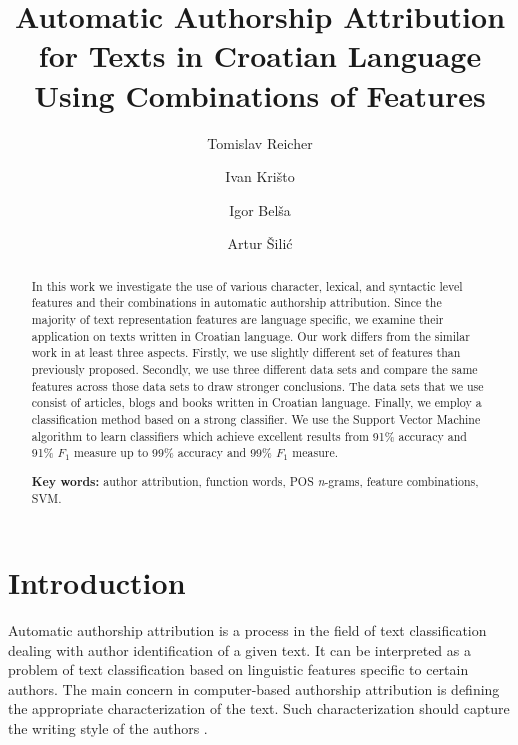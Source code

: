 \documentclass{llncs}
\begin{document}
\title{Automatic Authorship Attribution\\ for Texts in Croatian Language\\ Using
Combinations of Features}
\author{Tomislav Reicher \and Ivan Krišto \and Igor Belša \and Artur Šilić}

\maketitle

\begin{abstract}
In this work we investigate the use of various character, lexical, and syntactic
level features and their combinations in automatic authorship attribution. Since
the majority of text representation features are language specific, we examine
their application on texts written in Croatian language. Our work differs from
the similar work in at least three aspects. Firstly, we use slightly different
set of features than previously proposed. Secondly, we use three different
data sets and compare the same features across those data sets to draw stronger
conclusions. The data sets that we use consist of articles, blogs and books
written in Croatian language. Finally, we employ a classification method based on
a strong classifier. We use the Support Vector Machine algorithm to learn classifiers
which achieve excellent results from 91\% accuracy and 91\% $F_1$ measure up to
99\% accuracy and 99\% $F_1$ measure.

\vspace{10pt}
\textbf{Key words:} author attribution, function words, POS \emph{n}-grams,
feature combinations, SVM.
\end{abstract}


\section{Introduction}
Automatic authorship attribution is a process in the field of text classification
dealing with author identification of a given text. It can be interpreted
as a problem of text classification based on linguistic features specific to certain
authors. The main concern in computer-based authorship attribution is defining
the appropriate characterization of the text. Such characterization should
capture the writing style of the authors \cite{coyotl2006authorship}.
\end{document}
